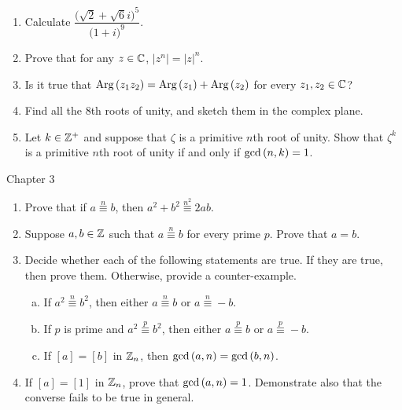 \documentclass[11pt,fleqn,dvipsnames,usenames]{article}
\begin{document}
\begin{enumerate}
\begin{multicols}{3}
\end{multicols}
\item Calculate $\dfrac{\big(\sqrt{2} + \sqrt{6}i\big)^5}{\big(1+i\big)^9}$.
\item Prove that for any $z\in\mathbb{C}$, $|z^{n}| = |z|^{n}$.
\item Is it true that $\text{Arg}\left(z_1z_2\right) = \text{Arg}\left(z_1\right) + \text{Arg}\left(z_2\right)$ for every $z_{1},z_{2}\in\mathbb{C}$?
\item Find all the $8$th roots of unity, and sketch them in the complex plane.
\item Let $k\in\mathbb{Z}^{+}$ and suppose that $\zeta$ is a primitive $n$th root of unity.  Show that $\zeta^{k}$ is a primitive $n$th root of unity if and only if $\text{gcd}\left(n,k\right) = 1$.
\end{enumerate}
\vsp

{\huge Chapter 3}
\vsp

\begin{enumerate}
\item Prove that if $a\overset{n}{\equiv}b$, then $a^2 + b^2\overset{n^2}{\equiv}2ab$.
\item Suppose $a,b\in\mathbb{Z}$ such that $a\overset{n}{\equiv}b$ for every prime $p$.  Prove that $a=b$.
\item Decide whether each of the following statements are true.  If they are true, then prove them.  Otherwise, provide a counter-example.
\begin{enumerate}[(a)]
\item If $a^2\overset{n}{\equiv}b^2$, then either $a\overset{n}{\equiv}b$ or $a\overset{n}{\equiv}-b$.
\item If $p$ is prime and $a^2\overset{p}{\equiv}b^2$, then either $a\overset{p}{\equiv}b$ or $a\overset{p}{\equiv}-b$.
\item If $[a] = [b]$ in $\mathbb{Z}_{n}$, then $\text{gcd}\left(a,n\right) = \text{gcd}\left(b,n\right)$.
\end{enumerate}
\item If $[a] = [1]$ in $\mathbb{Z}_{n}$, prove that $\text{gcd}\left(a,n\right) = 1$.  Demonstrate also that the converse fails to be true in general.
\end{enumerate}
\end{document}
